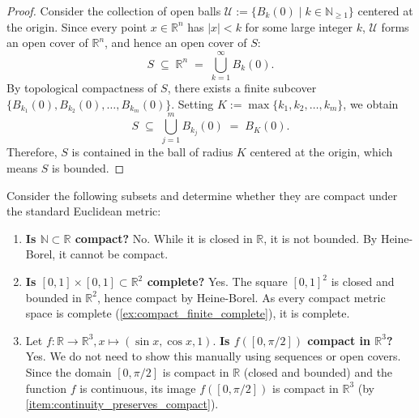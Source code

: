 \begin{proof}
Consider the collection of open balls $\mathcal{U} := \{B_k(0) \mid k \in \mathbb{N}_{\ge 1}\}$ centered at the origin. Since every point $x \in \mathbb{R}^n$ has $|x| < k$ for some large integer $k$, $\mathcal{U}$ forms an open cover of $\mathbb{R}^n$, and hence an open cover of $S$:
\[
S \;\subseteq\; \mathbb{R}^n \;=\; \bigcup_{k=1}^\infty B_k(0).
\]
By topological compactness of $S$, there exists a finite subcover $\{B_{k_1}(0), B_{k_2}(0), \dots, B_{k_m}(0)\}$. Setting $K := \max\{k_1, k_2, \dots, k_m\}$, we obtain
\[
S \;\subseteq\; \bigcup_{j=1}^m B_{k_j}(0) \;=\; B_K(0).
\]
Therefore, $S$ is contained in the ball of radius $K$ centered at the origin, which means $S$ is bounded.
\end{proof}

\begin{example}
\label{ex:compactness_heine_borel_examples}
Consider the following subsets and determine whether they are compact under the standard Euclidean metric:
\begin{enumerate}[label=\textbf{(\alph*)}]
  \item \textbf{Is $\mathbb{N} \subset \mathbb{R}$ compact?} No. While it is closed in $\mathbb{R}$, it is not bounded. By Heine-Borel, it cannot be compact.
  \item \textbf{Is $[0,1] \times [0,1] \subset \mathbb{R}^2$ complete?} Yes. The square $[0,1]^2$ is closed and bounded in $\mathbb{R}^2$, hence compact by Heine-Borel. As every compact metric space is complete (\cref{ex:compact_finite_complete}), it is complete.
  \item Let $f: \mathbb{R} \to \mathbb{R}^3, x \mapsto (\sin x, \cos x, 1)$. \textbf{Is $f([0,\pi/2])$ compact in $\mathbb{R}^3$?} Yes. We do not need to show this manually using sequences or open covers. Since the domain $[0,\pi/2]$ is compact in $\mathbb{R}$ (closed and bounded) and the function $f$ is continuous, its image $f([0,\pi/2])$ is compact in $\mathbb{R}^3$ (by \cref{item:continuity_preserves_compact}).
\end{enumerate}
\end{example}

